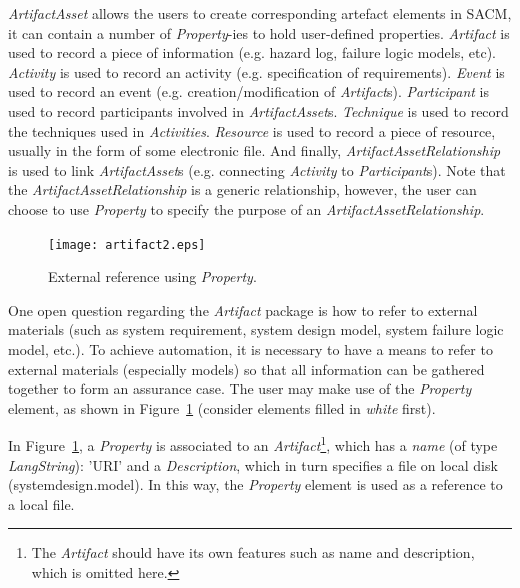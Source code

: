 \textit{ArtifactAsset} allows the users to create corresponding artefact elements in SACM, it can contain a number of \textit{Property}-ies to hold user-defined properties. \textit{Artifact} is used to record a piece of information (e.g. hazard log, failure logic models, etc). 
\textit{Activity} is used to record an activity (e.g. specification of requirements). 
\textit{Event} is used to record an event (e.g. creation/modification of \textit{Artifact}s). 
\textit{Participant} is used to record participants involved in \textit{ArtifactAsset}s. 
\textit{Technique} is used to record the techniques used in \textit{Activities}. \textit{Resource} is used to record a piece of resource, usually in the form of some electronic file. And finally, \textit{ArtifactAssetRelationship} is used to link \textit{ArtifactAsset}s (e.g. connecting \textit{Activity} to \textit{Participant}s). Note that the \textit{ArtifactAssetRelationship} is a generic relationship, however, the user can choose to use \textit{Property} to specify the purpose of an \textit{ArtifactAssetRelationship}. 

\begin{figure}
	\centering
	\texttt{[image: artifact2.eps]}
	\caption{External reference using \textit{Property}.}
	\label{fig:artifact1}
\end{figure}

One open question regarding the \textit{Artifact} package is how to refer to external materials (such as system requirement, system design model, system failure logic model, etc.). To achieve automation, it is necessary to have a means to refer to external materials (especially models) so that all information can be gathered together to form an assurance case. 
The user may make use of the \textit{Property} element, as shown in Figure~\ref{fig:artifact1} (consider elements filled in \textit{white} first).

In Figure~\ref{fig:artifact1}, a \textit{Property} is associated to an \textit{Artifact}\footnote{The \textit{Artifact} should have its own features such as name and description, which is omitted here.}, which has a \textit{name} (of type \textit{LangString}): 'URI' and a \textit{Description}, which in turn specifies a file on local disk (systemdesign.model). In this way, the \textit{Property} element is used as a reference to a local file. 


